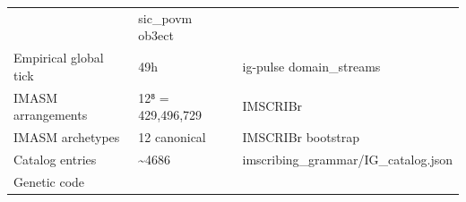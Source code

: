 \documentclass[12pt,a4paper]{article}
\begin{document}
\begin{longtable}[]{@{}lll@{}}
\begin{minipage}[t]{0.28\columnwidth}
\end{minipage} & \begin{minipage}[t]{0.32\columnwidth}\raggedright
sic\_povm ob3ect\strut
\end{minipage}\tabularnewline
\begin{minipage}[t]{0.32\columnwidth}\raggedright
Empirical global tick\strut
\end{minipage} & \begin{minipage}[t]{0.28\columnwidth}\raggedright
49h\strut
\end{minipage} & \begin{minipage}[t]{0.32\columnwidth}\raggedright
ig-pulse domain\_streams\strut
\end{minipage}\tabularnewline
\begin{minipage}[t]{0.32\columnwidth}\raggedright
IMASM arrangements\strut
\end{minipage} & \begin{minipage}[t]{0.28\columnwidth}\raggedright
12⁸ = 429,496,729\strut
\end{minipage} & \begin{minipage}[t]{0.32\columnwidth}\raggedright
IMSCRIBr\strut
\end{minipage}\tabularnewline
\begin{minipage}[t]{0.32\columnwidth}\raggedright
IMASM archetypes\strut
\end{minipage} & \begin{minipage}[t]{0.28\columnwidth}\raggedright
12 canonical\strut
\end{minipage} & \begin{minipage}[t]{0.32\columnwidth}\raggedright
IMSCRIBr bootstrap\strut
\end{minipage}\tabularnewline
\begin{minipage}[t]{0.32\columnwidth}\raggedright
Catalog entries\strut
\end{minipage} & \begin{minipage}[t]{0.28\columnwidth}\raggedright
\textasciitilde4686\strut
\end{minipage} & \begin{minipage}[t]{0.32\columnwidth}\raggedright
imscribing\_grammar/IG\_catalog.json\strut
\end{minipage}\tabularnewline
\begin{minipage}[t]{0.32\columnwidth}\raggedright
Genetic code\strut
\end{minipage} & \begin{minipage}[t]{0.28\columnwidth}\raggedright

\end{minipage}
\end{longtable}
\end{document}
